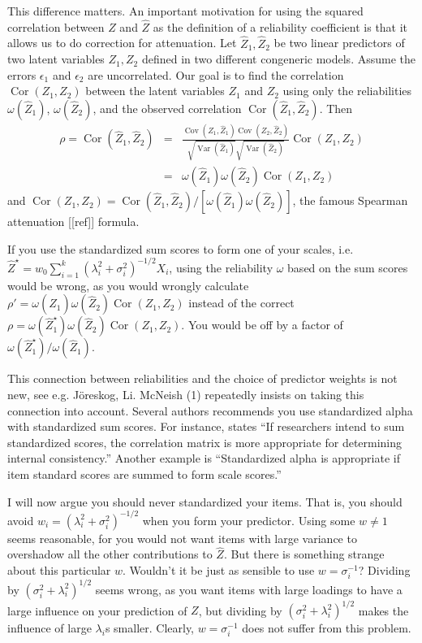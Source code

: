 \documentclass{article}
\theoremstyle{plain}
\theoremstyle{plain}
\theoremstyle{definition}
\theoremstyle{remark}
\theoremstyle{definition}
\theoremstyle{plain}
\theoremstyle{plain}
\theoremstyle{definition}
\DeclareMathOperator{\Var}{Var}
\DeclareMathOperator{\Cor}{Cor}
\DeclareMathOperator{\Cov}{Cov}
\begin{document}
This difference matters. An important motivation for using the squared
correlation between $Z$ and $\hat{Z}$ as the definition of a
reliability coefficient is that it allows us to do correction for
attenuation. Let $\hat{Z}_{1},\hat{Z}_{2}$ be two linear
predictors of two latent variables $Z_{1},Z_{2}$ defined in two different
congeneric models. Assume the errors $\epsilon_{1}$ and $\epsilon_{2}$
are uncorrelated. Our goal is to find the correlation $\Cor(Z_{1},Z_{2})$
between the latent variables $Z_{1}$ and $Z_{2}$ using only the
reliabilities $\omega(\hat{Z}_{1})$, $\omega(\hat{Z}_{2})$,
and the observed correlation $\Cor(\hat{Z}_{1},\hat{Z}_{2})$.
Then
\begin{eqnarray*}
\rho=\Cor(\hat{Z}_{1},\hat{Z}_{2}) & = & \frac{\Cov(Z_{1},\hat{Z}_{1})\Cov(Z_{2},\hat{Z}_{2})}{\sqrt{\Var(\hat{Z}_{1})}\sqrt{\Var(\hat{Z}_{2})}}\Cor(Z_{1},Z_{2})\\
 & = & \omega(\hat{Z}_{1})\omega(\hat{Z}_{2})\Cor(Z_{1},Z_{2})
\end{eqnarray*}
and $\Cor(Z_{1},Z_{2})=\Cor(\hat{Z}_{1},\hat{Z}_{2})/\left[\omega(\hat{Z}_{1})\omega(\hat{Z}_{2})\right]$,
the famous Spearman attenuation {[}{[}ref{]}{]} formula.

If you use the standardized sum scores to form one of your scales,
i.e. $\hat{Z}^{\star}=w_{0}\sum_{i=1}^{k}(\lambda_{i}^{2}+\sigma_{i}^{2})^{-1/2}X_{i}$,
using the reliability $\omega$ based on the sum scores would be wrong,
as you would wrongly calculate $\rho'=\omega(\hat{Z}_{1})\omega(\hat{Z}_{2})\Cor(Z_{1},Z_{2})$
instead of the correct $\rho=\omega(\hat{Z}_{1}^{\star})\omega(\hat{Z}_{2})\Cor(Z_{1},Z_{2})$.
You would be off by a factor of $\omega(\hat{Z}_{1}^{\star})/\omega(\hat{Z}_{1})$.

This connection between reliabilities and the choice of predictor
weights is not new, see e.g. Jöreskog, Li. McNeish (1) repeatedly
insists on taking this connection into account. Several authors recommends you use standardized alpha with standardized sum scores. For instance, \citet[][p.451]{Falk2011-ae} states \enquote{If researchers intend to sum
standardized scores, the correlation matrix is more appropriate for determining internal consistency.} Another example is \citet[][p.99]{Cortina1993-aq} \enquote{Standardized alpha is appropriate if item standard scores are summed to form scale scores.}

I will now argue you should never standardized your items. That is, you should avoid $w_{i}=(\lambda_{i}^{2}+\sigma_{i}^{2})^{-1/2}$ when you form your predictor.
Using some $w\ne1$ seems reasonable, for you would not want items
with large variance to overshadow all the other contributions to $\hat{Z}$.
But there is something strange about this particular $w$. Wouldn't
it be just as sensible to use $w=\sigma_{i}^{-1}$? Dividing by $(\sigma_{i}^{2}+\lambda_{i}^{2})^{1/2}$
seems wrong, as you want items with large loadings to have a large
influence on your prediction of $Z$, but dividing by $(\sigma_{i}^{2}+\lambda_{i}^{2})^{1/2}$
makes the influence of large $\lambda_{i}$s smaller. Clearly, $w=\sigma_{i}^{-1}$
does not suffer from this problem. 
\end{document}
